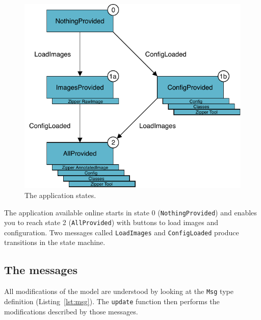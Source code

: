 \begin{figure}[ht]
\centering
\includegraphics[width=\columnwidth]{img/states-draw-io.pdf}
\caption{The application states.}%
\label{fig:states}
\end{figure}

The application available online starts in state 0 (\verb|NothingProvided|)
and enables you to reach state 2 (\verb|AllProvided|)
with buttons to load images and configuration.
Two messages called \verb|LoadImages| and \verb|ConfigLoaded| produce
transitions in the state machine.


\subsection{The messages}

All modifications of the model are understood
by looking at the \verb|Msg| type definition (Listing~\ref{lst:msg}).
The \verb|update| function then performs the modifications described by those messages.



